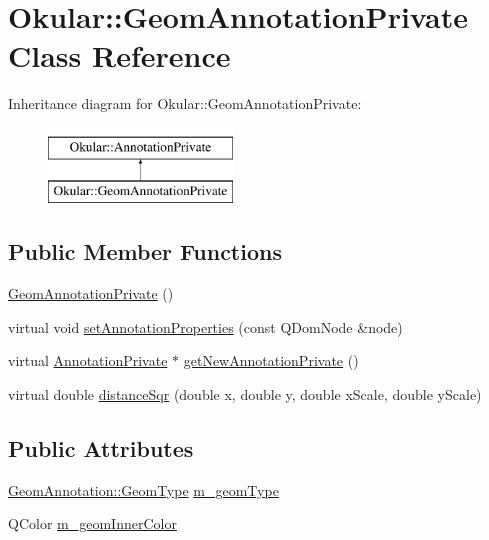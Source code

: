 \hypertarget{classOkular_1_1GeomAnnotationPrivate}{\section{Okular\+:\+:Geom\+Annotation\+Private Class Reference}
\label{classOkular_1_1GeomAnnotationPrivate}
}
Inheritance diagram for Okular\+:\+:Geom\+Annotation\+Private\+:\begin{figure}[H]
\begin{center}
\leavevmode
\includegraphics[height=2.000000cm]{classOkular_1_1GeomAnnotationPrivate}
\end{center}
\end{figure}
\subsection*{Public Member Functions}
\begin{DoxyCompactItemize}
\item 
\hyperlink{classOkular_1_1GeomAnnotationPrivate_a1c6b3f2ac89aa90729d48033460edf7f}{Geom\+Annotation\+Private} ()
\item 
virtual void \hyperlink{classOkular_1_1GeomAnnotationPrivate_affcf85e3740c0441b784b5d59b268d91}{set\+Annotation\+Properties} (const Q\+Dom\+Node \&node)
\item 
virtual \hyperlink{classOkular_1_1AnnotationPrivate}{Annotation\+Private} $\ast$ \hyperlink{classOkular_1_1GeomAnnotationPrivate_af9c31ab57cb28c74d38c9e1a9041569c}{get\+New\+Annotation\+Private} ()
\item 
virtual double \hyperlink{classOkular_1_1GeomAnnotationPrivate_af65b6c87ad945de67841b74d4dacefaf}{distance\+Sqr} (double x, double y, double x\+Scale, double y\+Scale)
\end{DoxyCompactItemize}
\subsection*{Public Attributes}
\begin{DoxyCompactItemize}
\item 
\hyperlink{classOkular_1_1GeomAnnotation_a511623ed10a8d1f18cfd5987fadee682}{Geom\+Annotation\+::\+Geom\+Type} \hyperlink{classOkular_1_1GeomAnnotationPrivate_a7a900a31ed0362b56d5e2172df3229dd}{m\+\_\+geom\+Type}
\item 
Q\+Color \hyperlink{classOkular_1_1GeomAnnotationPrivate_a78118f508054b9edd36744d8a5c18161}{m\+\_\+geom\+Inner\+Color}
\end{DoxyCompactItemize}


